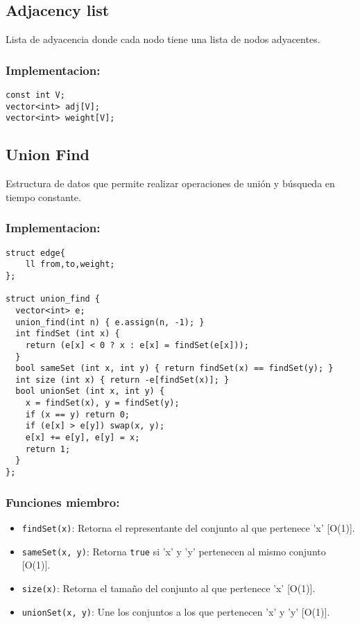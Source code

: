 \subsection{Adjacency list}
\label{subsec:adjacency_list}
Lista de adyacencia donde cada nodo tiene una lista de nodos adyacentes.

\subsubsection{Implementacion:}
\begin{lstlisting}[style=cpp]
const int V;
vector<int> adj[V];
vector<int> weight[V];
\end{lstlisting}

\subsection{Union Find}
\label{subsec:union_find}
Estructura de datos que permite realizar operaciones de unión y búsqueda en tiempo constante. 

\subsubsection{Implementacion:}
\begin{lstlisting}[style=cpp]
struct edge{
    ll from,to,weight;
};

struct union_find {
  vector<int> e;
  union_find(int n) { e.assign(n, -1); }
  int findSet (int x) { 
    return (e[x] < 0 ? x : e[x] = findSet(e[x]));
  }
  bool sameSet (int x, int y) { return findSet(x) == findSet(y); }
  int size (int x) { return -e[findSet(x)]; }
  bool unionSet (int x, int y) {
    x = findSet(x), y = findSet(y);
    if (x == y) return 0;
    if (e[x] > e[y]) swap(x, y);
    e[x] += e[y], e[y] = x;
    return 1;
  }
};
\end{lstlisting}

\subsubsection{Funciones miembro:}
\begin{itemize}
  \item \texttt{findSet(x)}: Retorna el representante del conjunto al que pertenece 'x' [O(1)].
  \item \texttt{sameSet(x, y)}: Retorna \texttt{true} si 'x' y 'y' pertenecen al mismo conjunto [O(1)].
  \item \texttt{size(x)}: Retorna el tamaño del conjunto al que pertenece 'x' [O(1)].
  \item \texttt{unionSet(x, y)}: Une los conjuntos a los que pertenecen 'x' y 'y' [O(1)].
\end{itemize}

